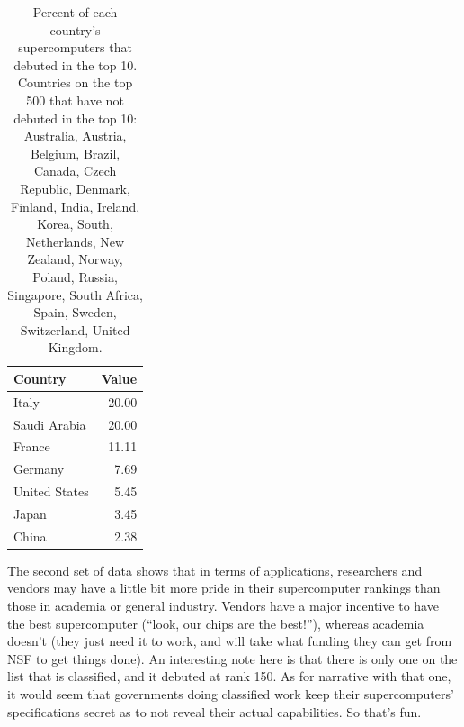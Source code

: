 \documentclass{article}
\begin{document}
\begin{table}[ht]
\centering
\begin{tabular}{lr}
  \hline
Country & Value \\ 
  \hline
Italy & 20.00 \\ 
  Saudi Arabia & 20.00 \\ 
  France & 11.11 \\ 
  Germany & 7.69 \\ 
  United States & 5.45 \\ 
  Japan & 3.45 \\ 
  China & 2.38 \\ 
   \hline
\end{tabular}
\caption{\label{tbl:country}Percent of each country's supercomputers that debuted in the top 10. Countries on the top 500 that have not debuted in
the top 10: Australia, Austria, Belgium, Brazil, Canada, Czech Republic, Denmark, Finland, India, Ireland, Korea, South, Netherlands, New Zealand, Norway, Poland, Russia, Singapore, South Africa, Spain, Sweden, Switzerland, United Kingdom.}
\end{table}

The second set of data shows that in terms of applications, researchers and vendors may have a little bit more pride
in their supercomputer rankings than those in academia or general industry. Vendors have a major incentive to have
the best supercomputer (``look, our chips are the best!''), whereas academia doesn't (they just need it to work,
and will take what funding they can get from NSF to get things done). An interesting note here is that
there is only one on the list that is classified, and it debuted at rank 150. As for narrative with that one, it would
seem that governments doing classified work keep their supercomputers' specifications secret as to not reveal their
actual capabilities. So that's fun.
\end{document}
